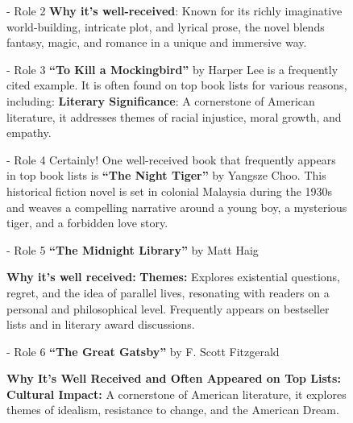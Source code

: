 \begin{figure}[t]
\begin{minipage}[t]{0.32\linewidth}
\begin{modarespboxsm}{\method{}- Role 2}
\textbf{Why it's well-received}: Known for its richly imaginative world-building, intricate plot, and lyrical prose, the novel blends fantasy, magic, and romance in a unique and immersive way.
\end{modarespboxsm}
\end{minipage}\hfill%
\begin{minipage}[t]{0.32\linewidth}
\begin{modarespboxsm}{\method{}- Role 3}
\textbf{``To Kill a Mockingbird''} by Harper Lee is a frequently cited example. It is often found on top book lists for various reasons, including: \textbf{Literary Significance}: A cornerstone of American literature, it addresses themes of racial injustice, moral growth, and empathy. 
\end{modarespboxsm}
\end{minipage}

\vspace{6pt}

\begin{minipage}[t]{0.32\linewidth}
\begin{modarespboxsm}{\method{}- Role 4}
Certainly! One well-received book that frequently appears in top book lists is \textbf{``The Night Tiger''} by Yangsze Choo. This historical fiction novel is set in colonial Malaysia during the 1930s and weaves a compelling narrative around a young boy, a mysterious tiger, and a forbidden love story.
\end{modarespboxsm}
\end{minipage}\hfill%
\begin{minipage}[t]{0.32\linewidth}
\begin{modarespboxsm}{\method{}- Role 5}
\textbf{``The Midnight Library''} by Matt Haig

\textbf{Why it's well received:} \textbf{Themes:} Explores existential questions, regret, and the idea of parallel lives, resonating with readers on a personal and philosophical level. Frequently appears on bestseller lists and in literary award discussions.
\end{modarespboxsm}
\end{minipage}\hfill%
\begin{minipage}[t]{0.32\linewidth}
\begin{modarespboxsm}{\method{}- Role 6}
\textbf{``The Great Gatsby''} by F. Scott Fitzgerald

\textbf{Why It's Well Received and Often Appeared on Top Lists:} \textbf{Cultural Impact:} A cornerstone of American literature, it explores themes of idealism, resistance to change, and the American Dream.
\end{modarespboxsm}
\end{minipage}


\end{figure}
